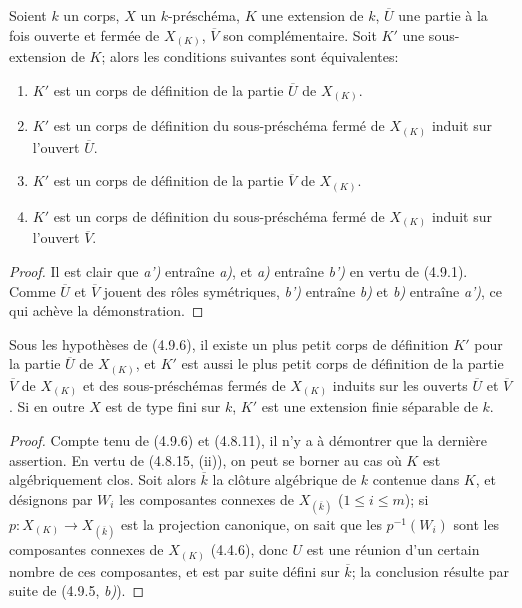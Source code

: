 \begin{proposition}[4.9.6]
\label{IV.2.4.9.6-fr}
Soient $k$ un corps, $X$ un $k$-préschéma, $K$ une extension de $k$,
$\overline U$ une partie à la fois ouverte et fermée de $X_{(K)}$,
$\overline V$ son complémentaire. Soit $K'$ une sous-extension de $K$;
alors les conditions suivantes sont équivalentes:
\begin{enumerate}
\item[\textup{a)}] $K'$ est un corps de définition de la partie $\overline U$ de
$X_{(K)}$.
\item[\textup{a')}] $K'$ est un corps de définition du sous-préschéma fermé de
$X_{(K)}$ induit sur l'ouvert $\overline U$.
\item[\textup{b)}] $K'$ est un corps de définition de la partie $\overline V$ de
$X_{(K)}$.
\item[\textup{b')}] $K'$ est un corps de définition du sous-préschéma fermé de
$X_{(K)}$ induit sur l'ouvert $\overline V$.
\end{enumerate}
\end{proposition}

\begin{proof}
Il est clair que \emph{a')} entraîne \emph{a)}, et \emph{a)} entraîne \emph{b')} en vertu de (4.9.1).
Comme $\overline U$ et $\overline V$ jouent des rôles symétriques, \emph{b')}
entraîne \emph{b)} et \emph{b)} entraîne \emph{a')}, ce qui achève la démonstration.
\end{proof}

\begin{corollary}[4.9.7]
\label{IV.2.4.9.7-fr}
Sous les hypothèses de \textup{(4.9.6)}, il existe un plus petit corps de définition
$K'$ pour la partie $\overline U$ de $X_{(K)}$, et $K'$ est aussi le plus
petit corps de définition de la partie $\overline V$ de $X_{(K)}$ et des
sous-préschémas fermés de $X_{(K)}$ induits sur les ouverts $\overline U$ et
$\overline V$. Si en outre $X$ est de type fini sur $k$, $K'$ est une
extension finie séparable de $k$.
\end{corollary}

\begin{proof}
Compte tenu de (4.9.6) et (4.8.11), il n'y a à démontrer que la dernière
assertion. En vertu de (4.8.15, (ii)), on peut se borner au cas où $K$ est
algébriquement clos. Soit alors $\overline k$ la clôture algébrique de $k$
contenue dans $K$, et désignons par $W_i$ les composantes
connexes de $X_{(\overline k)}$ ($1\leq i\leq m$); si
$p:X_{(K)}\to X_{(\overline k)}$ est la projection canonique, on sait que les
$p^{-1}(W_i)$ sont les composantes connexes de $X_{(K)}$ (4.4.6), donc
$U$ est une réunion d'un certain nombre de ces composantes, et est
par suite défini sur $\overline k$; la conclusion résulte par suite de
(4.9.5, \emph{b)}).
\end{proof}
